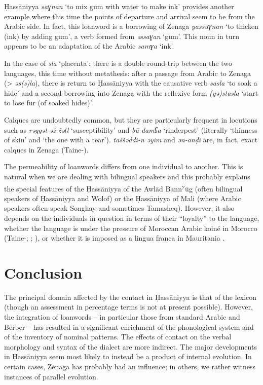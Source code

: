 \documentclass[output=paper]{langsci/langscibook}
\begin{document}
Ḥassāniyya \textit{saɣnan} ‘to mix gum with water to make ink’ provides another example where this time the points of departure and arrival seem to be from the Arabic side. In fact, this loanword is a borrowing of Zenaga \textit{yassuɣnan} ‘to thicken (ink) by adding gum’, a verb formed from \textit{əssaɣan} ‘gum’. This noun in turn appears to be an adaptation of the Arabic \textit{samɣa} ‘ink’. 

In the case of \textit{sla} ‘placenta’: there is a double round-trip between the two languages, this time without metathesis: after a passage from Arabic to Zenaga (> \textit{əs(s)la}), there is return to Ḥassāniyya with the causative verb \textit{sasla} ‘to soak a hide’ and a second borrowing into Zenaga with the reflexive form \textit{(yə)stasla} ‘start to lose fur (of soaked hides)’.


Calques are undoubtedly common, but they are particularly frequent in locutions such as \textit{rəggət} \textit{əž-žəll} ‘susceptibility’ and \textit{bū-damʕa} ‘rinderpest’ (literally ‘thinness of skin’ and ‘the one with a tear’). \textit{taššəddi-n} \textit{əyim} and \textit{ən-anḍi} are, in fact, exact calques in Zenaga (Taine-\citealt{Cheikh2008a}).


The permeability of loanwords differs from one individual to another. This is natural when we are dealing with bilingual speakers and this probably explains the special features of the Ḥassāniyya of the Awlād Bann\textsuperscript{y}ūg (often bilingual speakers of Ḥassāniyya and Wolof) or the Ḥassāniyya of Mali (where Arabic speakers often speak Songhay and sometimes Tamasheq). However, it also depends on the individuals in question in terms of their “loyalty” to the language, whether the language is under the pressure of Moroccan Arabic koiné in Morocco (Taine-\citealt{Cheikh1997b}; \citealt{Heath2002}; \citealt{Paciotti2017}), or whether it is imposed as a lingua franca in Mauritania \citep{Dia2007}.

\section{ Conclusion} %

The principal domain affected by the contact in Ḥassāniyya is that of the lexicon (though an assessment in percentage terms is not at present possible). However, the integration of loanwords – in particular those from standard Arabic and Berber – has resulted in a significant enrichment of the phonological system and of the inventory of nominal patterns. The effects of contact on the verbal morphology and syntax of the dialect are more indirect. The major developments in Ḥassāniyya seem most likely to instead be a product of internal evolution. In certain cases, Zenaga has probably had an influence; in others, we rather witness instances of parallel evolution. 
\end{document}

